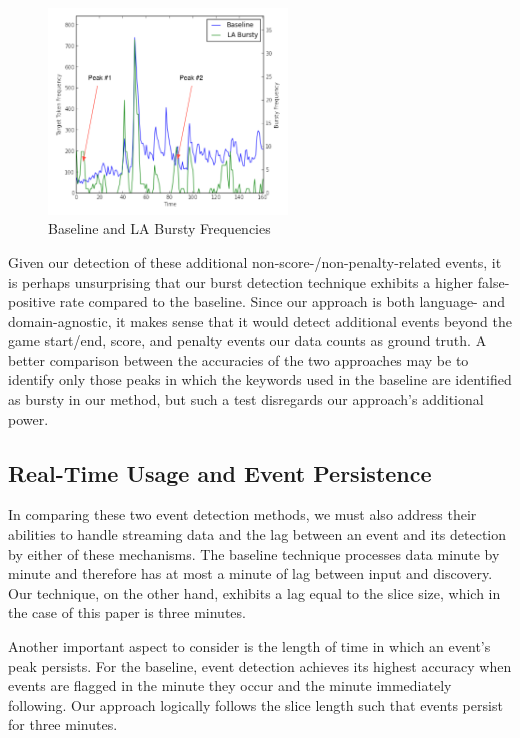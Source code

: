 \documentclass{sig-alternate}
\begin{document}
\begin{figure}[hbtp]
\begin{center}
\includegraphics[width=2.5in]{./figures/wc0713freq-labeled.png}
\caption{Baseline and LA Bursty Frequencies}
\label{fig:worldCupFreqs}
\end{center}
\end{figure}

Given our detection of these additional non-score-/non-penalty-related events, it is perhaps unsurprising that our burst detection technique exhibits a higher false-positive rate compared to the baseline.
Since our approach is both language- and domain-agnostic, it makes sense that it would detect additional events beyond the game start/end, score, and penalty events our data counts as ground truth.
A better comparison between the accuracies of the two approaches may be to identify only those peaks in which the keywords used in the baseline are identified as bursty in our method, but such a test disregards our approach's additional power.

\subsection{Real-Time Usage and Event Persistence}

In comparing these two event detection methods, we must also address their abilities to handle streaming data and the lag between an event and its detection by either of these mechanisms.
The baseline technique processes data minute by minute and therefore has at most a minute of lag between input and discovery.
Our technique, on the other hand, exhibits a lag equal to the slice size, which in the case of this paper is three minutes.

Another important aspect to consider is the length of time in which an event's peak persists.
For the baseline, event detection achieves its highest accuracy when events are flagged in the minute they occur and the minute immediately following.
Our approach logically follows the slice length such that events persist for three minutes.
\end{document}
